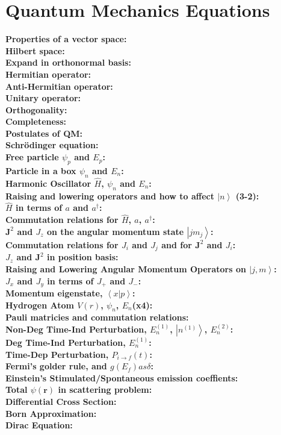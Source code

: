 \documentclass[12pt]{extarticle}
\newcommand{\ket}[1]{\left| #1 \right>}
\newcommand{\braket}[2]{\left< #1 | #2 \right>}
\begin{document}
\section{Quantum Mechanics Equations}
\textbf{Properties of a vector space:} \\
\textbf{Hilbert space:} \\
\textbf{Expand in orthonormal basis:}  \\
\textbf{Hermitian operator:} \\
\textbf{Anti-Hermitian operator:} \\
\textbf{Unitary operator:} \\
\textbf{Orthogonality:} \\
\textbf{Completeness:} \\
\textbf{Postulates of QM: } \\
\textbf{Schr\"odinger equation:} \\
\textbf{Free particle $\psi_p$ and $E_p$:} \\
\textbf{Particle in a box $\psi_n$ and $E_n$:} \\
\textbf{Harmonic Oscillator $\hat{H}$, $\psi_n$ and $E_n$:} \\
\textbf{Raising and lowering operators and how to affect $\ket{n}$ (3-2):} \\
\textbf{$\hat{H}$ in terms of $a$ and $a^\dagger$:} \\
\textbf{Commutation relations for $\hat{H}$, $a$, $a^\dagger$:} \\
\textbf{$\mathbf{J}^2$ and $J_z$ on the angular momentum state $\ket{jm_j}$:} \\
\textbf{Commutation relations for $J_i$ and $J_j$ and for $\mathbf{J}^2$ and $J_i$:} \\
\textbf{$J_z$ and $\mathbf{J}^2$ in position basis:} \\
\textbf{Raising and Lowering Angular Momentum Operators on $\ket{j,m}$:} \\
\textbf{$J_x$ and $J_y$ in terms of $J_+$ and $J_-$:} \\
\textbf{Momentum eigenstate, $\braket{x}{p}$:} \\
\textbf{Hydrogen Atom $V(r)$, $\psi_n$, $E_n$(x4):} \\
\textbf{Pauli matricies and commutation relations:} \\
\textbf{Non-Deg Time-Ind Perturbation, $E_n^{(1)}$, $\ket{n^{(1)}}$, $E_n^{(2)}$:} \\
\textbf{Deg Time-Ind Perturbation, $E_n^{(1)}$:} \\
\textbf{Time-Dep Perturbation, $P_{i\rightarrow f}(t)$:} \\
\textbf{Fermi's golder rule, and $g(E_f) as \delta$:} \\
\textbf{Einstein's Stimulated/Spontaneous emission coeffients:} \\
\textbf{Total $\psi(\mathbf{r})$ in scattering problem:} \\
\textbf{Differential Cross Section:} \\
\textbf{Born Approximation:} \\
\textbf{Dirac Equation:} \\
\end{document}
